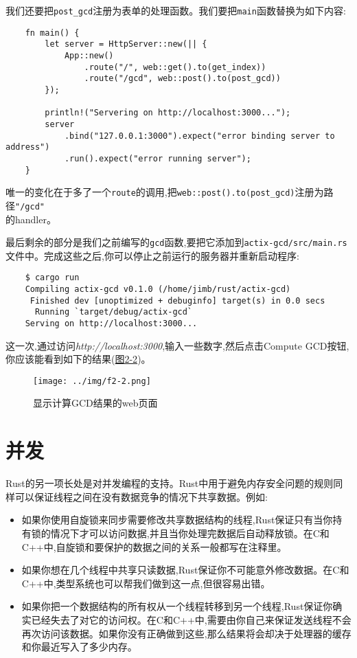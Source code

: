 我们还要把\texttt{post\_gcd}注册为表单的处理函数。我们要把\texttt{main}函数替换为如下内容:
\begin{verbatim}
    fn main() {
        let server = HttpServer::new(|| {
            App::new()
                .route("/", web::get().to(get_index))
                .route("/gcd", web::post().to(post_gcd))
        });

        println!("Servering on http://localhost:3000...");
        server
            .bind("127.0.0.1:3000").expect("error binding server to address")
            .run().expect("error running server");
    }
\end{verbatim}

唯一的变化在于多了一个\texttt{route}的调用,把\texttt{web::post().to(post\_gcd)}注册为路径\texttt{"/gcd"}\\
的handler。

最后剩余的部分是我们之前编写的\texttt{gcd}函数,要把它添加到\texttt{actix-gcd/src/main.rs}文件中。完成这些之后,你可以停止之前运行的服务器并重新启动程序:
\begin{verbatim}
    $ cargo run
    Compiling actix-gcd v0.1.0 (/home/jimb/rust/actix-gcd)
     Finished dev [unoptimized + debuginfo] target(s) in 0.0 secs
      Running `target/debug/actix-gcd`
    Serving on http://localhost:3000...
\end{verbatim}

这一次,通过访问\emph{http://localhost:3000},输入一些数字,然后点击Compute GCD按钮,你应该能看到如下的结果(\hyperref[f2-2]{图2-2})。
\begin{figure}[htbp]
    \centering
    \texttt{[image: ../img/f2-2.png]}
    \caption{显示计算GCD结果的web页面}
    \label{f2-2}
\end{figure}

\section{并发}
Rust的另一项长处是对并发编程的支持。Rust中用于避免内存安全问题的规则同样可以保证线程之间在没有数据竞争的情况下共享数据。例如:
\begin{itemize}
    \item 如果你使用自旋锁来同步需要修改共享数据结构的线程,Rust保证只有当你持有锁的情况下才可以访问数据,并且当你处理完数据后自动释放锁。在C和C++中,自旋锁和要保护的数据之间的关系一般都写在注释里。
    \item 如果你想在几个线程中共享只读数据,Rust保证你不可能意外修改数据。在C和C++中,类型系统也可以帮我们做到这一点,但很容易出错。
    \item 如果你把一个数据结构的所有权从一个线程转移到另一个线程,Rust保证你确实已经失去了对它的访问权。在C和C++中,需要由你自己来保证发送线程不会再次访问该数据。如果你没有正确做到这些,那么结果将会却决于处理器的缓存和你最近写入了多少内存。
\end{itemize}

